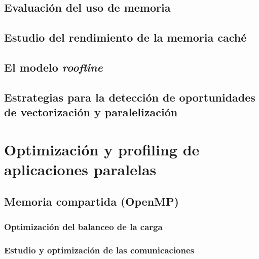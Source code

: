 \documentclass[10pt]{beamer}
\begin{document}
\frame{
}

\subsection{Evaluación del uso de memoria}

\frame{
}

\subsection{Estudio del rendimiento de la memoria caché}

\frame{
}


\subsection{El modelo \emph{roofline}}

\frame{
}

\subsection{Estrategias para la detección de oportunidades de
  vectorización y paralelización}

\frame{
}

\section{Optimización y profiling de aplicaciones paralelas}


\subsection{Memoria compartida (OpenMP)}

\frame{
}

\subsubsection{Optimización del balanceo de la carga}

\frame{
}

\subsubsection{Estudio y optimización de las comunicaciones}
\end{document}
